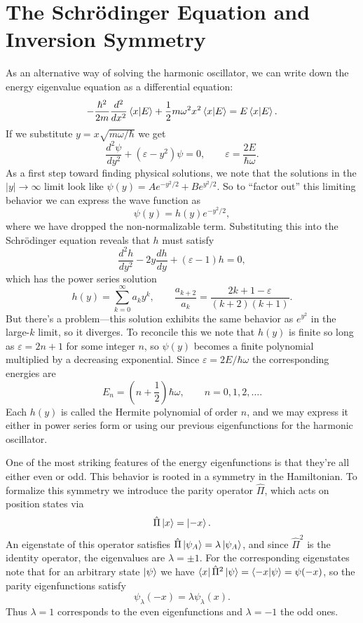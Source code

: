 \documentclass[../p116main.tex]{subfiles}
\begin{document}
\section{The Schrödinger Equation and Inversion Symmetry}
As an alternative way of solving the harmonic oscillator, we can write down the energy eigenvalue equation as a differential equation:
\[ -\frac{\hbar^2}{2m} \frac{d^2}{dx^2} \left< x \middle| E \right> + \frac{1}{2} m \omega^2 x^2 \left< x \middle| E \right> = E \left< x \middle| E \right>. \]
If we substitute $y = x \sqrt{m\omega / \hbar}$ we get
\[ \frac{d^2 \psi}{dy^2} + (\varepsilon - y^2) \psi = 0, \qquad \varepsilon = \frac{2E}{\hbar \omega}. \]
As a first step toward finding physical solutions, we note that the solutions in the $|y| \to \infty$ limit look like $\psi(y) = A e^{-y^2 / 2} + B e^{y^2 / 2}$.
So to ``factor out'' this limiting behavior we can express the wave function as
\[ \psi(y) = h(y) e^{-y^2 / 2}, \]
where we have dropped the non-normalizable term.
Substituting this into the Schrödinger equation reveals that $h$ must satisfy
\[ \frac{d^2 h}{dy^2} - 2y \frac{d h}{dy} + (\varepsilon - 1) h = 0, \]
which has the power series solution
\[ h(y) = \sum_{k=0}^{\infty} a_k y^{k}, \qquad \frac{a_{k+2}}{a_k} = \frac{2k+1 - \varepsilon}{(k+2)(k+1)}. \]
But there's a problem---this solution exhibits the same behavior as $e^{y^2}$ in the large-$k$ limit, so it diverges.
To reconcile this we note that $h(y)$ is finite so long as $\varepsilon = 2n + 1$ for some integer $n$, so $\psi(y)$ becomes a finite polynomial multiplied by a decreasing exponential.
Since $\varepsilon = 2E / \hbar \omega$ the corresponding energies are
\[ E_n = \left( n + \frac{1}{2} \right) \hbar \omega, \qquad n = 0, 1, 2, \ldots. \]
Each $h(y)$ is called the Hermite polynomial of order $n$, and we may express it either in power series form or using our previous eigenfunctions for the harmonic oscillator.

One of the most striking features of the energy eigenfunctions is that they're all either even or odd.
This behavior is rooted in a symmetry in the Hamiltonian.
To formalize this symmetry we introduce the parity operator $\hat \Pi$, which acts on position states via
\[ \hat \Pi \left| x \right> = \left| -x \right>. \]
An eigenstate of this operator satisfies $\hat \Pi \left| \psi_A \right> = \lambda \left| \psi_A \right>$, and since $\hat \Pi^2$ is the identity operator, the eigenvalues are $\lambda = \pm 1$.
For the corresponding eigenstates note that for an arbitrary state $\left| \psi \right>$ we have $\left< x \right| \hat \Pi^2 \left| \psi \right> = \left< -x \middle| \psi \right> = \psi(-x)$, so the parity eigenfunctions satisfy
\[ \psi_\lambda(-x) = \lambda \psi_\lambda(x). \]
Thus $\lambda = 1$ corresponds to the even eigenfunctions and $\lambda = -1$ the odd ones.
\end{document}
